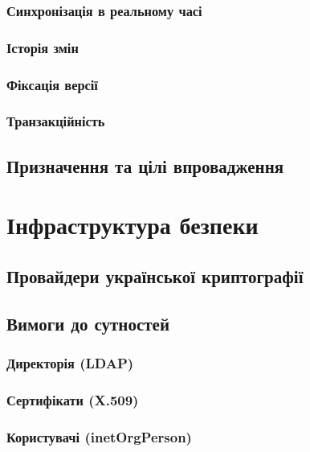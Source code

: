 \subsubsection{Синхронізація в реальному часі}

\subsubsection{Історія змін}

\subsubsection{Фіксація версії}

\subsubsection{Транзакційність}

\subsection{Призначення та цілі впровадження}

\newpage
\section{Інфраструктура безпеки}

\subsection{Провайдери української криптографії}

\subsection{Вимоги до сутностей}

\subsubsection{Директорія (LDAP)}

\subsubsection{Сертифікати (X.509)}

\subsubsection{Користувачі (inetOrgPerson)}

